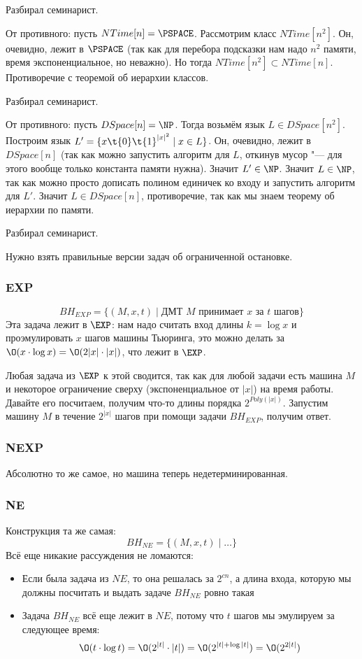 	Разбирал семинарист.

	От противного: пусть $NTime[n] = \PSPACE$.
	Рассмотрим класс $NTime[n^2]$.
	Он, очевидно, лежит в $\PSPACE$ (так как для перебора подсказки нам надо $n^2$
	памяти, время экспоненциальное, но неважно).
	Но тогда $NTime[n^2] \subset NTime[n]$.
	Противоречие с теоремой об иерархии классов.

	Разбирал семинарист.

	От противного: пусть $DSpace[n] = \NP$.
	Тогда возьмём язык $L \in DSpace[n^2]$.
	Построим язык $L' = \{ x\t{0}\t{1}^{|x|^2} \mid x \in L \}$.
	Он, очевидно, лежит в $DSpace[n]$ (так как можно запустить алгоритм для $L$, откинув мусор "--- для этого
	вообще только константа памяти нужна).
	Значит $L' \in \NP$.
	Значит $L \in \NP$, так как можно просто дописать полином единичек ко входу и запустить алгоритм для $L'$.
	Значит $L \in DSpace[n]$, противоречие, так как мы знаем теорему об иерархии по памяти.

	Разбирал семинарист.

	Нужно взять правильные версии задач об ограниченной остановке.

	\subsubsection{EXP}
		\[ BH_{EXP} = \{ (M, x, t) \mid \text{ДМТ $M$ принимает $x$ за $t$ шагов} \} \]
		Эта задача лежит в $\EXP$: нам надо считать вход длины $k=\log x$ и проэмулировать
		$x$ шагов машины Тьюринга, это можно делать за $\O(x \cdot \log x)=\O(2{|x|}\cdot |x|)$, что лежит
		в $\EXP$.

		Любая задача из $\EXP$ к этой сводится, так как для любой задачи есть машина $M$
		и некоторое ограничение сверху (экспоненциальное от $|x|$) на время работы.
		Давайте его посчитаем, получим что-то длины порядка $2^{Poly(|x|)}$.
		Запустим машину $M$ в течение $2^{|x|}$ шагов при помощи задачи $BH_{EXP}$,
		получим ответ.

	\subsubsection{NEXP}
		Абсолютно то же самое, но машина теперь недетерминированная.

	\subsubsection{NE}
		Конструкция та же самая:
		\[ BH_{NE} = \{ (M, x, t) \mid \dots \} \]
		Всё еще никакие рассуждения не ломаются:
		\begin{itemize}
			\item Если была задача из $NE$, то она решалась за $2^{cn}$, а длина входа, которую мы должны посчитать и выдать задаче $BH_{NE}$ ровно такая
			\item Задача $BH_{NE}$ всё еще лежит в $NE$, потому что $t$ шагов мы эмулируем за следующее время:
				\[ \O(t \cdot \log t) = \O(2^{|t|} \cdot |t|) = \O(2^{|t|+\log |t|}) = \O(2^{2|t|}) \]
		\end{itemize}

